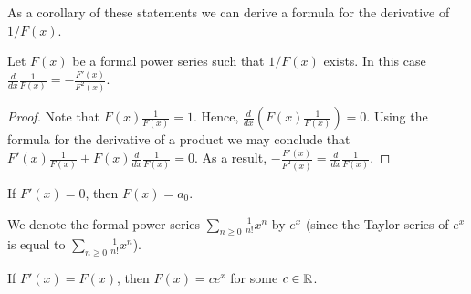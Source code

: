 As a corollary of these statements we can derive a formula for the derivative of
$1 / F(x)$.
\begin{corollary}
  Let $F(x)$ be a formal power series such that $1 / F(x)$ exists. In this
  case $\frac{d}{dx} \frac{1}{F(x)} = -\frac{F'(x)}{F^2(x)}$.
\end{corollary}
\begin{proof}
  Note that $F(x) \frac{1}{F(x)} = 1$. Hence,
  $\frac{d}{dx}(F(x) \frac{1}{F(x)}) = 0$. Using the formula for the derivative
  of a product we may conclude that $F'(x)\frac{1}{F(x)} +
  F(x)\frac{d}{dx}\frac{1}{F(x)} = 0$. As a result,
  $-\frac{F'(x)}{F^2(x)} = \frac{d}{dx} \frac{1}{F(x)}$.
\end{proof}

\begin{remark}
  If $F'(x) = 0$, then $F(x) = a_0$.
\end{remark}

We denote the formal power series $\sum_{n \ge 0} \frac{1}{n!} x^n$ by $e^x$
(since the Taylor series of $e^x$ is equal to
$\sum_{n \ge 0} \frac{1}{n!} x^n$).
\begin{remark}
  If $F'(x) = F(x)$, then $F(x) = c e^x$ for some $c \in {\mathbb{R}}$.
\end{remark}
